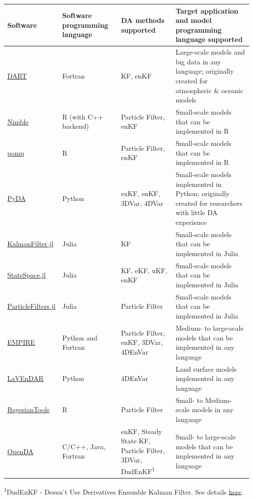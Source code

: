 \documentclass[
]{book}
\begin{document}
\begin{longtable}[]{@{}
  >{\raggedright\arraybackslash}p{}
  >{\raggedright\arraybackslash}p{}
  >{\raggedright\arraybackslash}p{}
  >{\raggedright\arraybackslash}p{}@{}}
\toprule
\textbf{Software} & \textbf{Software programming language} & \textbf{DA methods supported} & \textbf{Target application and model programming language supported} \\
\midrule
\endhead
\href{https://dart.ucar.edu/}{DART} & Fortran & KF, enKF & Large-scale models and big data in any language; originally created for atmospheric \& oceanic models \\
\href{https://r-nimble.org/}{Nimble} & R (with C++ backend) & Particle Filter, enKF & Small-scale models that can be implemented in R \\
\href{https://kingaa.github.io/pomp/}{pomp} & R & Particle Filter, enKF & Small-scale models that can be implemented in R \\
\href{https://www.mdpi.com/2311-5521/5/4/225}{PyDA} & Python & exKF, enKF, 3DVar, 4DVar & Small-scale models implemented in Python; originally created for researchers with little DA experience \\
\href{https://github.com/mschauer/Kalman.jl}{KalmanFilter.jl} & Julia & KF & Small-scale models that can be implemented in Julia \\
\href{https://github.com/ElOceanografo/StateSpace.jl}{StateSpace.jl} & Julia & KF, eKF, uKF, enKF & Small-scale models that can be implemented in Julia \\
\href{https://github.com/JuliaPOMDP/ParticleFilters.jl}{ParticleFilters.jl} & Julia & Particle Filter & Small-scale models that can be implemented in Julia \\
\href{http://www.met.reading.ac.uk/~darc/empire/index.php}{EMPIRE} & Python and Fortran & Particle Filter, enKF, 3DVar, 4DEnVar & Medium- to large-scale models that can be implemented in any language \\
\href{https://gmd.copernicus.org/preprints/gmd-2019-60/gmd-2019-60.pdf}{LaVEnDAR} & Python & 4DEnVar & Land surface models implemented in any language \\
\href{https://cran.r-project.org/web/packages/BayesianTools/index.html}{BayesianTools} & R & Particle Filter & Small- to Medium-scale models in any language \\
\href{https://www.openda.org/}{OpenDA} & C/C++, Java, Fortran & enKF, Steady State KF, Particle Filter, 3DVar, DudEnKF\textsuperscript{1} & Small- to large-scale models that can be implemented in any language \\
\bottomrule
\end{longtable}

\textsuperscript{1}DudEnKF - Doesn't Use Derivatives Ensemble Kalman Filter. See details \href{https://www.sciencedirect.com/science/article/pii/S0043135419311170}{here}.

  
\end{document}
